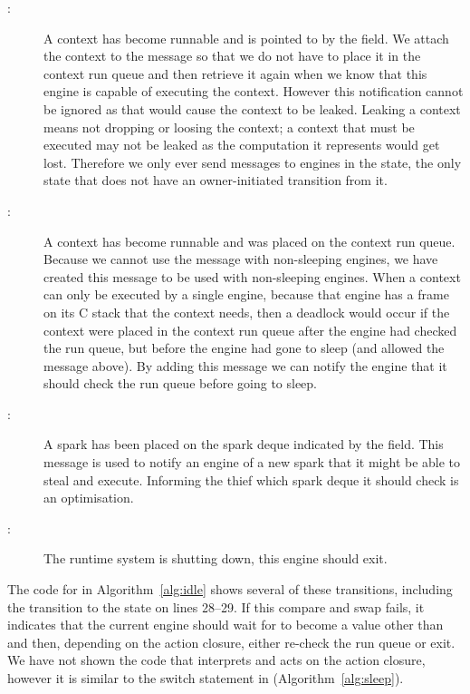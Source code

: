 \begin{description}

    \item[:]
    A context has become runnable and is pointed to by the
     field.
    We attach the context to the message so that we do not have to place it
    in the context run queue and then retrieve it again when we know that
    this engine is capable of executing the context.
    However this notification cannot be ignored as that would cause the
    context to be leaked.
    Leaking a context means not dropping or loosing the context;
    a context that must be executed may not be leaked as the computation it
    represents would get lost.
    Therefore we only ever send  messages to engines in
    the  state,
    the only state that does not have an owner-initiated transition from
    it.

    \item[:]
    A context has become runnable and was placed on the context run queue.
    Because we cannot use the  message with
    non-sleeping engines,
    we have created this message to be used with non-sleeping engines.
    When a context can only be executed by a single engine,
    because that engine has a frame on its C stack that the context needs,
    then a deadlock would occur if the context were placed in the context run
    queue after the engine had checked the run queue,
    but before the engine had gone to sleep (and allowed the message above).
    By adding this message we can notify the engine that it should check the
    run queue before going to sleep.

    \item[:]
    A spark has been placed on the spark deque indicated by the
     field.
    This message is used to notify an engine of a new spark that it might be
    able to steal and execute.
    Informing the thief which spark deque it should check is an
    optimisation.

    \item[:]
    The runtime system is shutting down, this engine should exit.

\end{description}

\noindent
{}
The code for \idle in Algorithm~\ref{alg:idle} shows several of these
transitions,
including the transition to the  state on lines 28--29.
If this compare and swap fails,
it indicates that the current engine should
wait for  to become a value other than  and then,
depending on the action closure,
either re-check the run queue or exit.
We have not shown the code that interprets and acts on the action closure,
however it is similar to the switch statement in \sleep
(Algorithm~\ref{alg:sleep}).


